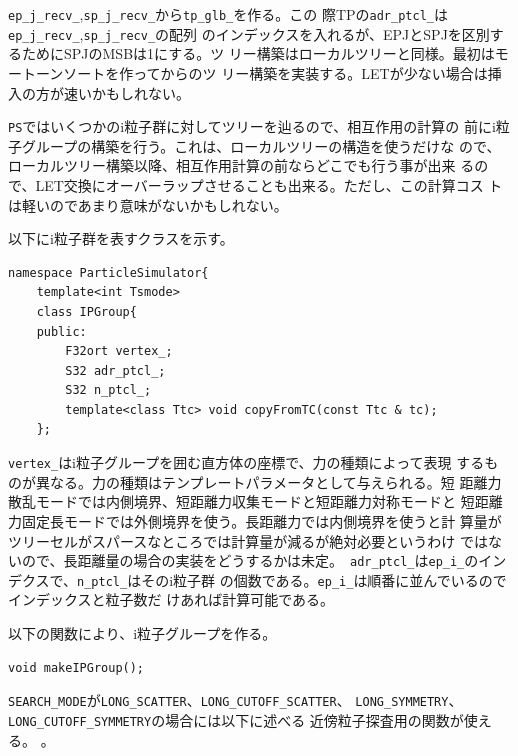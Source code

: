 




{\tt ep\_j\_recv\_},{\tt sp\_j\_recv\_}から{\tt tp\_glb\_}を作る。この
際TPの{\tt adr\_ptcl\_}は{\tt ep\_j\_recv\_},{\tt sp\_j\_recv\_}の配列
のインデックスを入れるが、EPJとSPJを区別するためにSPJのMSBは1にする。ツ
リー構築はローカルツリーと同様。最初はモートーンソートを作ってからのツ
リー構築を実装する。LETが少ない場合は挿入の方が速いかもしれない。




{\tt PS}ではいくつかのi粒子群に対してツリーを辿るので、相互作用の計算の
前にi粒子グループの構築を行う。これは、ローカルツリーの構造を使うだけな
ので、ローカルツリー構築以降、相互作用計算の前ならどこでも行う事が出来
るので、LET交換にオーバーラップさせることも出来る。ただし、この計算コス
トは軽いのであまり意味がないかもしれない。

以下にi粒子群を表すクラスを示す。

\begin{lstlisting}[caption=IPGroup]
namespace ParticleSimulator{
    template<int Tsmode>
    class IPGroup{
    public:
        F32ort vertex_;
        S32 adr_ptcl_;
        S32 n_ptcl_;
        template<class Ttc> void copyFromTC(const Ttc & tc);
    };
\end{lstlisting}

{\tt vertex\_}はi粒子グループを囲む直方体の座標で、力の種類によって表現
するものが異なる。力の種類はテンプレートパラメータとして与えられる。短
距離力散乱モードでは内側境界、短距離力収集モードと短距離力対称モードと
短距離力固定長モードでは外側境界を使う。長距離力では内側境界を使うと計
算量がツリーセルがスパースなところでは計算量が減るが絶対必要というわけ
ではないので、長距離量の場合の実装をどうするかは未定。{\tt
adr\_ptcl\_}は{\tt ep\_i\_}のインデクスで、{\tt n\_ptcl\_}はそのi粒子群
の個数である。{\tt ep\_i\_}は順番に並んでいるのでインデックスと粒子数だ
けあれば計算可能である。

以下の関数により、i粒子グループを作る。

\begin{screen}
\begin{verbatim}
void makeIPGroup();
\end{verbatim}
\end{screen}







{\tt SEARCH\_MODE}が{\tt LONG_SCATTER}、{\tt LONG_CUTOFF_SCATTER}、
{\tt LONG_SYMMETRY}、{\tt LONG_CUTOFF_SYMMETRY}の場合には以下に述べる
近傍粒子探査用の関数が使える。
。

